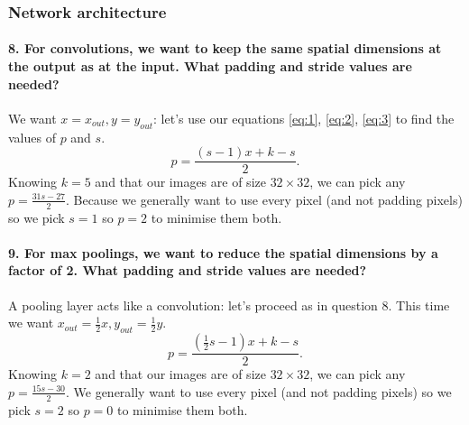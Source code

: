 \documentclass{article}
\theoremstyle{plain}%
\theoremstyle{definition}
\theoremstyle{remark}
\begin{document}
\subsubsection{Network architecture}
\paragraph{8. For convolutions, we want to keep the same spatial dimensions at the output as at the input. What padding and stride values are needed?}
We want $ x = x_{out}, y = y_{out} $: let's use our equations \ref{eq:1}, \ref{eq:2}, \ref{eq:3} to find the values of $p$ and $s$.
\[
    p = \frac{(s-1)x + k - s}{2}
.\]
Knowing $k = 5$ and that our images are of size $32 \times 32 $, we can pick any $p = \frac{31s - 27}{2}$. Because we generally want to use every pixel (and not padding pixels) so we pick $ s = 1 $ so $ p = 2 $ to minimise them both.


\paragraph{9. For max poolings, we want to reduce the spatial dimensions by a factor of 2. What padding and stride values are needed?} 
A pooling layer acts like a convolution: let's proceed as in question 8. This time we want $ x_{out} = \frac{1}{2}x, y_{out} = \frac{1}{2}y$.
\[
    p = \frac{(\frac{1}{2}s - 1) x + k - s}{2}
.\]
Knowing $k = 2$ and that our images are of size $32 \times 32 $, we can pick any $p = \frac{15s - 30}{2}$. We generally want to use every pixel (and not padding pixels) so we pick $ s = 2 $ so $ p = 0 $ to minimise them both.
\end{document}
